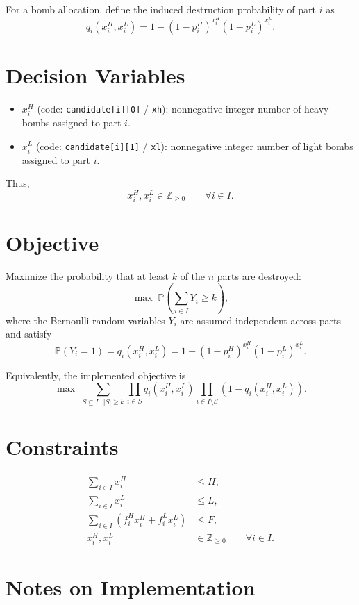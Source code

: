 For a bomb allocation, define the induced destruction probability of part $i$ as
\[
q_i(x_i^H,x_i^L)=1-(1-p_i^H)^{x_i^H}(1-p_i^L)^{x_i^L}.
\]

\section*{Decision Variables}

\begin{itemize}
    \item $x_i^H$ (code: \texttt{candidate[i][0]} / \texttt{xh}): nonnegative integer number of heavy bombs assigned to part $i$.
    \item $x_i^L$ (code: \texttt{candidate[i][1]} / \texttt{xl}): nonnegative integer number of light bombs assigned to part $i$.
\end{itemize}

Thus,
\[
x_i^H,x_i^L \in \mathbb{Z}_{\ge 0}\qquad \forall i\in I.
\]

\section*{Objective}

Maximize the probability that at least $k$ of the $n$ parts are destroyed:
\[
\max \; \mathbb{P}\!\left(\sum_{i\in I} Y_i \ge k\right),
\]
where the Bernoulli random variables $Y_i$ are assumed independent across parts and satisfy
\[
\mathbb{P}(Y_i=1)=q_i(x_i^H,x_i^L)
=1-(1-p_i^H)^{x_i^H}(1-p_i^L)^{x_i^L}.
\]

Equivalently, the implemented objective is
\[
\max \; \sum_{S\subseteq I:\; |S|\ge k}
\prod_{i\in S} q_i(x_i^H,x_i^L)
\prod_{i\in I\setminus S} \left(1-q_i(x_i^H,x_i^L)\right).
\]

\section*{Constraints}

\begin{align}
\sum_{i\in I} x_i^H &\le \bar H, \\
\sum_{i\in I} x_i^L &\le \bar L, \\
\sum_{i\in I} \left(f_i^H x_i^H + f_i^L x_i^L\right) &\le F, \\
x_i^H,x_i^L &\in \mathbb{Z}_{\ge 0} \qquad \forall i\in I.
\end{align}

\section*{Notes on Implementation}

